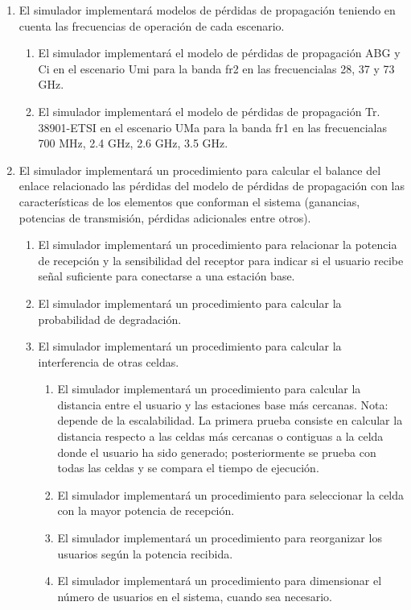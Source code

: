 \begin{enumerate}
            \item El simulador implementará modelos de pérdidas de propagación teniendo en cuenta las frecuencias de operación de cada escenario.
                \begin{enumerate}            
                    \item El simulador implementará el modelo de pérdidas de propagación ABG y Ci en el escenario Umi para la banda fr2 en las frecuencialas 28, 37 y 73 GHz.
                    \item El simulador implementará el modelo de pérdidas de propagación Tr. 38901-ETSI en el escenario UMa para la banda fr1 en las frecuencialas 700 MHz, 2.4 GHz,  2.6 GHz, 3.5 GHz.
                \end{enumerate}
            
            
            \item El simulador implementará un procedimiento para calcular el balance del enlace relacionado las pérdidas del modelo de pérdidas de propagación con las características de los elementos que conforman el sistema (ganancias, potencias de transmisión, pérdidas adicionales entre otros). %
            
            \begin{enumerate}
                \item El simulador implementará un procedimiento para %
                relacionar la potencia de recepción y la sensibilidad del receptor para indicar si el usuario recibe señal suficiente para conectarse a una estación base.%
                \item El simulador implementará un procedimiento para calcular la probabilidad de degradación.
                
                \item El simulador implementará un procedimiento para calcular la interferencia de otras celdas.
                    \begin{enumerate}
                        \item El simulador implementará un procedimiento para calcular la distancia entre el usuario y las estaciones base más cercanas. Nota: depende de la escalabilidad. La primera prueba consiste en calcular la distancia respecto a las celdas más cercanas o contiguas a la celda donde el usuario ha sido generado; posteriormente se prueba con todas las celdas y se compara el tiempo de ejecución.
                        \item El simulador implementará un procedimiento para seleccionar la celda con la mayor potencia de recepción.
                        \item El simulador implementará un procedimiento para reorganizar los usuarios según la potencia recibida.
                        \item El simulador implementará un procedimiento para dimensionar el número de usuarios en el sistema, cuando sea necesario.
                    \end{enumerate}
            \end{enumerate}
        

\end{enumerate}
